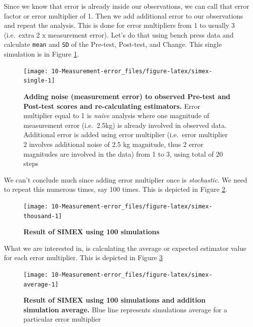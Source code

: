 \documentclass[
]{book}
\begin{document}
Since we know that error is already inside our observations, we can call that error factor or error multiplier of 1. Then we add additional error to our observations and repeat the analysis. This is done for error multipliers from 1 to usually 3 (i.e.~extra 2 x measurement error). Let's do that using bench press data and calculate \texttt{mean} and \texttt{SD} of the Pre-test, Post-test, and Change. This single simulation is in Figure \ref{fig:simex-single}.

\begin{figure}

{\centering \texttt{[image: 10-Measurement-error\_files/figure-latex/simex-single-1]} 

}

\caption{\textbf{Adding noise (measurement error) to observed Pre-test and Post-test scores and re-calculating estimators.} Error multiplier equal to 1 is \emph{naive} analysis where one magnitude of measurement error (i.e.~2.5kg) is already involved in observed data. Additional error is added using error multiplier (i.e.~error multiplier 2 involves additional noise of 2.5 kg magnitude, thus 2 error magnitudes are involved in the data) from 1 to 3, using total of 20 steps}\label{fig:simex-single}
\end{figure}



We can't conclude much since adding error multiplier once is \emph{stochastic}. We need to repeat this numerous times, say 100 times. This is depicted in Figure \ref{fig:simex-thousand}.

\begin{figure}

{\centering \texttt{[image: 10-Measurement-error\_files/figure-latex/simex-thousand-1]} 

}

\caption{\textbf{Result of SIMEX using 100 simulations}}\label{fig:simex-thousand}
\end{figure}



What we are interested in, is calculating the average or expected estimator value for each error multiplier. This is depicted in Figure \ref{fig:simex-average}

\begin{figure}

{\centering \texttt{[image: 10-Measurement-error\_files/figure-latex/simex-average-1]} 

}

\caption{\textbf{Result of SIMEX using 100 simulations and addition simulation average.} Blue line represents simulations average for a particular error multiplier}\label{fig:simex-average}
\end{figure}
\end{document}
